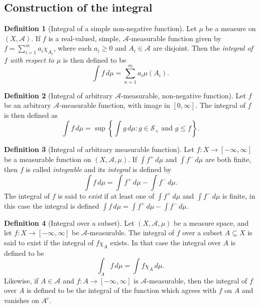 \documentclass[12pt]{article}
\theoremstyle{definition}
\newtheorem{definition}{Definition}[section]
\newcommand{\algebra}{\mathscr{A}}
\begin{document}
\subsection{Construction of the integral}
\begin{definition}[Integral of a simple non-negative function]
    Let $\mu$ be a measure on $(X,\algebra)$. If $f$ is a real-valued, simple, $\algebra$-measurable function given by $f=\sum_{i=1}^m a_i \chi_{A_i}$, where each $a_i\geq0$ and $A_i\in\algebra$ are disjoint. Then the \textit{integral of $f$ with respect to $\mu$} is then defined to be
    \begin{equation*}
        \int f \,d\mu = \sum_{n=1}^m a_i \mu(A_i).
    \end{equation*}
\end{definition}
\begin{definition}[Integral of arbitrary $\algebra$-measurable, non-negative function]
    Let $f$ be an arbitrary $\algebra$-measurable function, with image in $[0,\infty]$. The integral of $f$ is then defined as
    \begin{equation*}
        \int f \,d\mu=\sup \left\{ \int g \,d\mu : g\in \mathscr{S}_+ \text{ and } g\leq f\right\}.
    \end{equation*}
\end{definition}
\begin{definition}[Integral of arbitrary measurable function]
    Let $f:X\to [-\infty,\infty]$ be a measurable function on $(X,\algebra,\mu)$. If $\int f^+ \,d\mu$ and $\int f^- \,d\mu$ are both finite, then $f$ is called \textit{integrable} and its \textit{integral} is defined by
    \begin{equation*}
        \int f \, d\mu=\int f^+ \, d\mu -\int f^- \, d\mu.
    \end{equation*}
    The integral of $f$ is said to \textit{exist} if at least one of $\int f^+ \,d\mu$ and $\int f^- \,d\mu$ is finite, in this case the integral is defined $\int f \, d\mu=\int f^+ \, d\mu -\int f^- \, d\mu$.
\end{definition}
\begin{definition}[Integral over a subset]
    Let $(X,\algebra,\mu)$ be a measure space, and let $f:X\to [-\infty,\infty]$ be $\algebra$-measurable. 
    The integral of $f$ over a subset $A\subseteq X$ is said to exist if the integral of $f\chi_A$ exists. In that case the integral over $A$ is defined to be
    \begin{equation*}
        \int_A f \, d\mu=\int f\chi_A \, d\mu.
    \end{equation*}
    Likewise, if $A\in \algebra$ and $f:A\to [-\infty,\infty]$ is $\algebra$-measurable, then the integral of $f$ over $A$ is defined to be the integral of the function which agrees with $f$ on $A$ and vanishes on $A^c$.
\end{definition}
\end{document}

